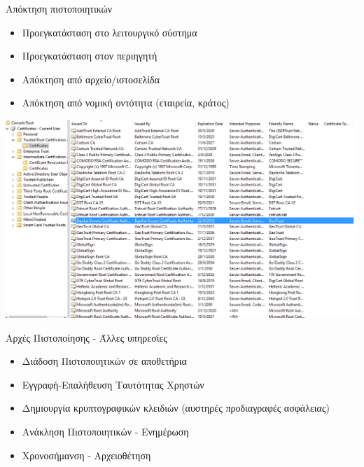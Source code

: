 \documentclass[handout]{beamer}
\begin{document}
\begin{frame}{Απόκτηση πιστοποιητικών}
\begin{itemize}
\item Προεγκατάσταση στο λειτουργικό σύστημα
\pause
\item Προεγκατάσταση στον περιηγητή
\pause
\item Απόκτηση από αρχείο/ιστοσελίδα
\pause
\item Απόκτηση από νομική οντότητα (εταιρεία, κράτος)
\pause
\end{itemize}
  \begin{center}
    \includegraphics[scale=0.3]{certificates.PNG}
    \end{center} 
\end{frame}

\begin{frame}{Αρχές Πιστοποίησης - Άλλες υπηρεσίες}
    \begin{itemize}
        \item  Διάδοση Πιστοποιητικών σε αποθετήρια
        \pause
        \item  Εγγραφή-Επαλήθευση Ταυτότητας Χρηστών 
        \pause
        \item  Δημιουργία κρυπτογραφικών κλειδιών (αυστηρές προδιαγραφές ασφάλειας)
        \pause
        \item  Ανάκληση Πιστοποιητικών - Ενημέρωση
        \pause
        \item  Χρονοσήμανση - Αρχειοθέτηση
    \end{itemize}
\end{frame}
\end{document}
